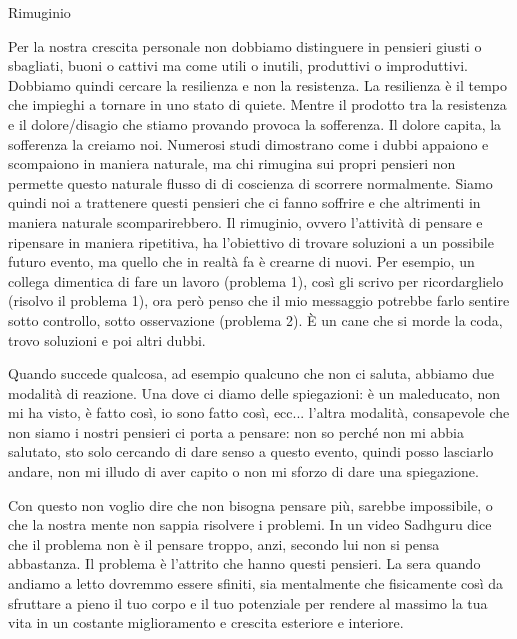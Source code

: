 \documentclass[12pt]{book} %
\begin{document}
\bigskip

Rimuginio

Per la nostra crescita personale non dobbiamo distinguere in pensieri giusti o sbagliati, buoni o cattivi ma come utili
o inutili, produttivi o improduttivi. Dobbiamo quindi cercare la resilienza e non la resistenza. La resilienza è il
tempo che impieghi a tornare in uno stato di quiete. Mentre il prodotto tra la resistenza e il dolore/disagio che
stiamo provando provoca la sofferenza. Il dolore capita, la sofferenza la creiamo noi. Numerosi studi dimostrano come i
dubbi appaiono e scompaiono in maniera naturale, ma chi rimugina sui propri pensieri non permette questo naturale
flusso di di coscienza di scorrere normalmente. Siamo quindi noi a trattenere questi pensieri che ci fanno soffrire e
che altrimenti in maniera naturale scomparirebbero. Il rimuginio, ovvero l'attività di pensare e
ripensare in maniera ripetitiva, ha l'obiettivo di trovare soluzioni a un possibile futuro evento, ma quello che in
realtà fa è crearne di nuovi. Per esempio, un collega dimentica di fare un lavoro (problema 1), così gli scrivo per
ricordarglielo (risolvo il problema 1), ora però penso che il mio messaggio potrebbe farlo sentire sotto controllo,
sotto osservazione (problema 2). È un cane che si morde la coda, trovo soluzioni e poi altri dubbi.

Quando succede qualcosa, ad esempio qualcuno che non ci saluta, abbiamo due modalità di reazione. Una dove ci diamo delle spiegazioni: è un maleducato, non mi ha visto, è fatto così, io sono fatto così, ecc... l'altra modalità, consapevole che non siamo i nostri pensieri ci porta a pensare: non so perché non mi abbia salutato, sto solo cercando di dare senso a questo evento, quindi posso lasciarlo andare, non mi illudo di aver capito o non mi sforzo di dare una spiegazione.

Con questo non voglio dire che non bisogna pensare più, sarebbe impossibile, o che la nostra mente non sappia risolvere
i problemi. In un video Sadhguru dice che il problema non è il pensare troppo, anzi, secondo lui non si pensa abbastanza. Il problema è l'attrito che hanno questi pensieri. La sera quando andiamo a letto dovremmo essere sfiniti, sia mentalmente che fisicamente così da sfruttare a pieno il tuo corpo e il tuo potenziale per rendere al massimo la tua vita in un costante miglioramento e crescita esteriore e interiore.
\end{document}
